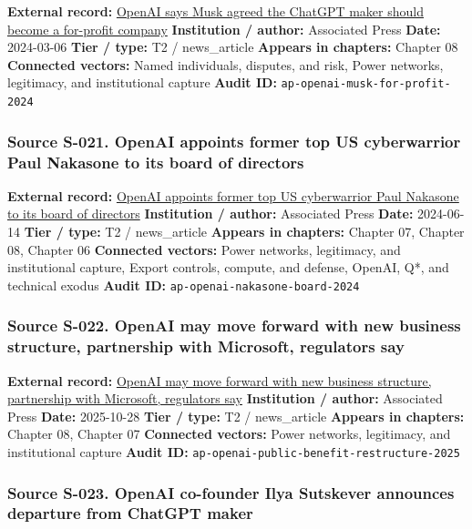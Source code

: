 \documentclass[
  american,
  11pt,
  letterpaper,
]{article}
\begin{document}
\textbf{External record:}
\href{https://apnews.com/article/4a4c0a19316f849f65db9e6d2b0b7a6b}{OpenAI
says Musk agreed the ChatGPT maker should become a for-profit company}
\textbf{Institution / author:} Associated Press \textbf{Date:}
2024-03-06 \textbf{Tier / type:} T2 / news\_article \textbf{Appears in
chapters:} Chapter 08 \textbf{Connected vectors:} Named individuals,
disputes, and risk, Power networks, legitimacy, and institutional
capture \textbf{Audit ID:} \texttt{ap-openai-musk-for-profit-2024}

\subsubsection{Source S-021. OpenAI appoints former top US cyberwarrior
Paul Nakasone to its board of
directors}\label{source-s-021-openai-appoints-former-top-us-cyberwarrior-paul-nakasone-to-its-board-of-directors}

\textbf{External record:}
\href{https://apnews.com/article/6ef612a3a0fcaef05480bbd1ebbd79b1}{OpenAI
appoints former top US cyberwarrior Paul Nakasone to its board of
directors} \textbf{Institution / author:} Associated Press
\textbf{Date:} 2024-06-14 \textbf{Tier / type:} T2 / news\_article
\textbf{Appears in chapters:} Chapter 07, Chapter 08, Chapter 06
\textbf{Connected vectors:} Power networks, legitimacy, and
institutional capture, Export controls, compute, and defense, OpenAI,
Q*, and technical exodus \textbf{Audit ID:}
\texttt{ap-openai-nakasone-board-2024}

\subsubsection{Source S-022. OpenAI may move forward with new business
structure, partnership with Microsoft, regulators
say}\label{source-s-022-openai-may-move-forward-with-new-business-structure-partnership-with-microsoft-regulators-say}

\textbf{External record:}
\href{https://apnews.com/article/c661df3242766d6b0ddbab401ad1fd84}{OpenAI
may move forward with new business structure, partnership with
Microsoft, regulators say} \textbf{Institution / author:} Associated
Press \textbf{Date:} 2025-10-28 \textbf{Tier / type:} T2 / news\_article
\textbf{Appears in chapters:} Chapter 08, Chapter 07 \textbf{Connected
vectors:} Power networks, legitimacy, and institutional capture
\textbf{Audit ID:} \texttt{ap-openai-public-benefit-restructure-2025}

\subsubsection{Source S-023. OpenAI co-founder Ilya Sutskever announces
departure from ChatGPT
maker}\label{source-s-023-openai-co-founder-ilya-sutskever-announces-departure-from-chatgpt-maker}
\end{document}
